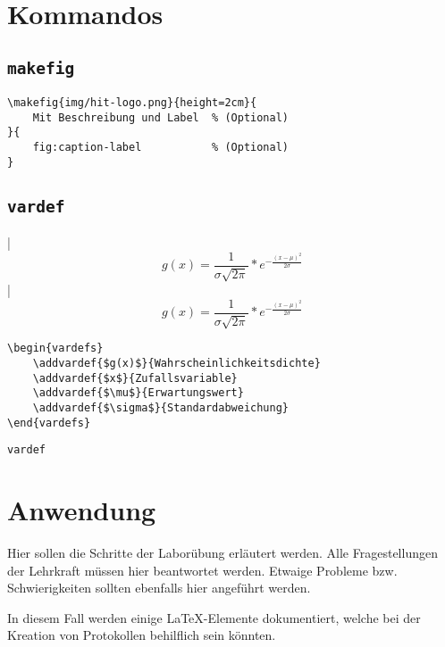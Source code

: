 \newpage
\section{Kommandos}\label{sec:Kommandos}
\subsection{\texttt{makefig}}

\begin{verbatim}
\makefig{img/hit-logo.png}{height=2cm}{
    Mit Beschreibung und Label  % (Optional)
}{
    fig:caption-label           % (Optional)
}
\end{verbatim}

\subsection{\texttt{vardef}}
|$$g(x) = \frac{1}{\sigma\sqrt{2\pi}} * e^{-\frac{(x-\mu)^2}{2\sigma}}$$|
$$g(x) = \frac{1}{\sigma\sqrt{2\pi}} * e^{-\frac{(x-\mu)^2}{2\sigma}}$$
\begin{listing}[H]
\begin{verbatim}
\begin{vardefs}
    \addvardef{$g(x)$}{Wahrscheinlichkeitsdichte}
    \addvardef{$x$}{Zufallsvariable}
    \addvardef{$\mu$}{Erwartungswert}
    \addvardef{$\sigma$}{Standardabweichung}
\end{vardefs}
\end{verbatim}
\caption{\texttt{vardef}}
\label{lst:vardef}
\end{listing}

\begin{vardefs}
\end{vardefs}

\newpage
\section{Anwendung}\label{sec:Anwendung}
Hier sollen die Schritte der Laborübung erläutert werden. Alle Fragestellungen der Lehrkraft müssen hier beantwortet werden. Etwaige Probleme bzw. Schwierigkeiten sollten ebenfalls hier angeführt werden.

In diesem Fall werden einige \LaTeX-Elemente dokumentiert, welche bei der Kreation von Protokollen behilflich sein könnten.

